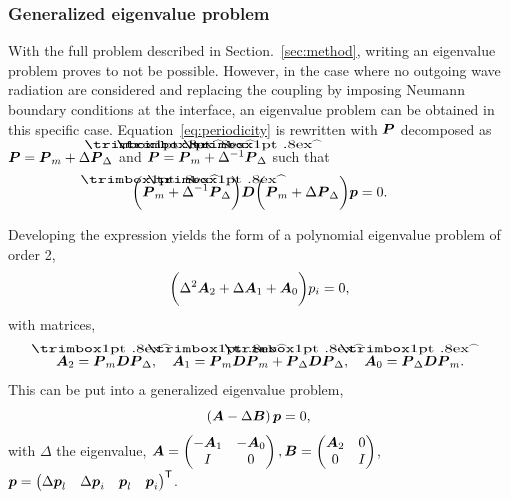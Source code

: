 \subsubsection{Generalized eigenvalue problem}
With the full problem described in Section.~\ref{sec:method}, writing an eigenvalue problem proves to not be possible. However, in the case where no outgoing wave radiation are considered and replacing the coupling by imposing Neumann boundary conditions at the interface, an eigenvalue problem can be obtained in this specific case. Equation~\ref{eq:periodicity} is rewritten with $\boldsymbol P$ decomposed as $\boldsymbol P = \boldsymbol P_m + \Delta \boldsymbol P_\Delta$ and $\hat {\mbf P} = \mbf{\hat{P}}_m + \Delta^{-1} \mbf{\hat{P}}_\Delta$ such that 
\begin{equation}
    \bigg(\mbf{\hat{P}}_m + \Delta^{-1} \mbf{\hat{P}}_\Delta\bigg) \mbf D \bigg(\mbf P_m +\Delta \mbf P_\Delta\bigg) \mbf p = 0.
\end{equation}
    
Developing the expression yields the form of a polynomial eigenvalue problem of order 2,  
\begin{equation}
    \bigg( \Delta^2 \boldsymbol A_2 + \Delta \boldsymbol A_1 + \boldsymbol A_0 \bigg) p_i = 0,
\end{equation}
with matrices,
\begin{equation}
        \mbf A_2 = \mbf{\hat{P}}_m \mbf D \mbf P_\Delta, \quad \mbf A_1 = \mbf{\hat{P}}_m \mbf D \mbf P_m + \mbf{\hat{P}}_\Delta \mbf D \mbf P_\Delta, \quad \mbf A_0 = \mbf{\hat{P}}_\Delta \mbf D \mbf P_m.
\end{equation}
This can be put into a generalized eigenvalue problem,
\begin{equation}
    \left( \boldsymbol A - \Delta \boldsymbol B \right) \boldsymbol p = 0, \\
\end{equation}
with $\Delta$ the eigenvalue, $\boldsymbol A = \begin{pmatrix}
    -\boldsymbol A_1 & - \boldsymbol A_0 \\ I & 0
\end{pmatrix}, \boldsymbol B  = \begin{pmatrix}
    \boldsymbol A_2 & 0 \\ 0 & I
\end{pmatrix}$, $\boldsymbol p = \begin{pmatrix}
    \Delta \boldsymbol p_l & \Delta \boldsymbol p_i & \boldsymbol p_l & \boldsymbol p_i
\end{pmatrix}^\mathsf T$.

